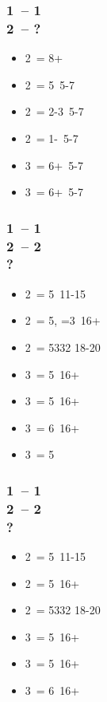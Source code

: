 \documentclass[12pt, a4paper]{report}
\begin{document}
{    \subsubsection*{1\spades\ -- 1\ntx\ \\ 2\clubs\ -- ?}
    \begin{itemize}
        \item 2\diams\ = 8+
        \item 2\hearts\ = 5\hearts\ 5-7
        \item 2\spades\ = 2-3\spades\ 5-7
        \item 2\ntx\ = 1-\spades\ 5-7
        \item 3\clubs\ = 6+\clubs\ 5-7
        \item 3\diams\ = 6+\diams\ 5-7
    \end{itemize}

    \subsubsection*{1\hearts\ -- 1\spades\ \\ 2\clubs\ -- 2\diams \\ ?}
    \begin{itemize}
        \item 2\hearts\ = 5\clubs\ 11-15
        \item 2\spades\ = 5\hearts, =3\spades\ 16+
        \item 2\ntx\ = 5332 18-20
        \item 3\clubs\ = 5\clubs\ 16+
        \item 3\diams\ = 5\diams\ 16+
        \item 3\hearts\ = 6\hearts\ 16+
        \item 3\spades\ = 5\spades\ \gf
    \end{itemize}

    \subsubsection*{1\hearts\ -- 1\ntx\ \\ 2\clubs\ -- 2\diams \\ ?}
    \begin{itemize}
        \item 2\hearts\ = 5\clubs\ 11-15
        \item 2\spades\ = 5\spades\ 16+
        \item 2\ntx\ = 5332 18-20
        \item 3\clubs\ = 5\clubs\ 16+
        \item 3\diams\ = 5\diams\ 16+
        \item 3\hearts\ = 6\hearts\ 16+
    \end{itemize}

}
\end{document}
